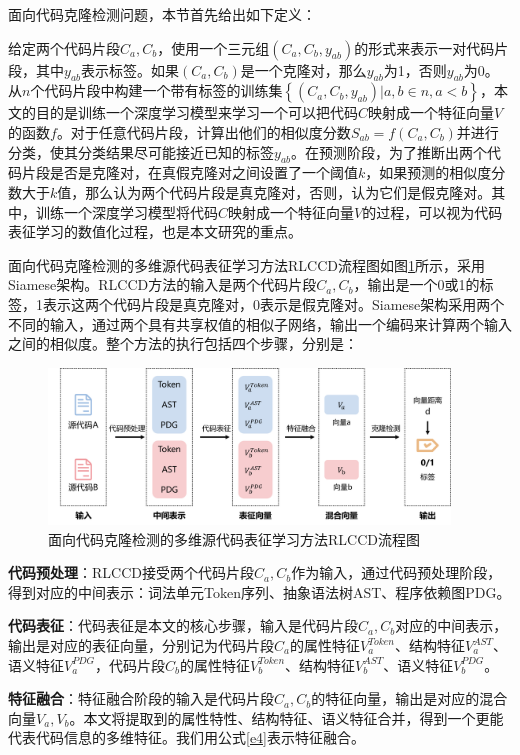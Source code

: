 面向代码克隆检测问题，本节首先给出如下定义：

给定两个代码片段$C_{a},C_{b}$，使用一个三元组$(C_{a},C_{b},y_{ab})$的形式来表示一对代码片段，其中$y_{ab}$表示标签。如果$(C_{a},C_{b})$是一个克隆对，那么$y_{ab}$为1，否则$y_{ab}$为0。从$n$个代码片段中构建一个带有标签的训练集$\left\{(C_{a},C_{b},y_{ab})|a,b \in n,a<b\right\}$，本文的目的是训练一个深度学习模型来学习一个可以把代码$C$映射成一个特征向量$V$的函数$f$。对于任意代码片段，计算出他们的相似度分数$S_{ab} = f(C_{a},C_{b})$并进行分类，使其分类结果尽可能接近已知的标签$y_{ab}$。在预测阶段，为了推断出两个代码片段是否是克隆对，在真假克隆对之间设置了一个阈值$k$，如果预测的相似度分数大于$k$值，那么认为两个代码片段是真克隆对，否则，认为它们是假克隆对。其中，训练一个深度学习模型将代码$C$映射成一个特征向量$V$的过程，可以视为代码表征学习的数值化过程，也是本文研究的重点。

面向代码克隆检测的多维源代码表征学习方法RLCCD流程图如图\ref{fig:flow}所示，采用Siamese架构。RLCCD方法的输入是两个代码片段$C_{a},C_{b}$，输出是一个0或1的标签，1表示这两个代码片段是真克隆对，0表示是假克隆对。Siamese架构采用两个不同的输入，通过两个具有共享权值的相似子网络，输出一个编码来计算两个输入之间的相似度。整个方法的执行包括四个步骤，分别是：
\begin{figure}[H]
    \centering
    \includegraphics[width=0.95\textwidth]{figures/flow}
    \caption{面向代码克隆检测的多维源代码表征学习方法RLCCD流程图}
    \label{fig:flow}
\end{figure}

\textbf{代码预处理}：RLCCD接受两个代码片段$C_{a},C_{b}$作为输入，通过代码预处理阶段，得到对应的中间表示：词法单元Token序列、抽象语法树AST、程序依赖图PDG。

\textbf{代码表征}：代码表征是本文的核心步骤，输入是代码片段$C_{a},C_{b}$对应的中间表示，输出是对应的表征向量，分别记为代码片段$C_{a}$的属性特征$V_{a}^{Token}$、结构特征$V_{a}^{AST}$、语义特征$V_{a}^{PDG}$，代码片段$C_{b}$的属性特征$V_{b}^{Token}$、结构特征$V_{b}^{AST}$、语义特征$V_{b}^{PDG}$。

\textbf{特征融合}：特征融合阶段的输入是代码片段$C_{a},C_{b}$的特征向量，输出是对应的混合向量$V_{a},V_{b}$。本文将提取到的属性特性、结构特征、语义特征合并，得到一个更能代表代码信息的多维特征。我们用公式\ref{e4}表示特征融合。


